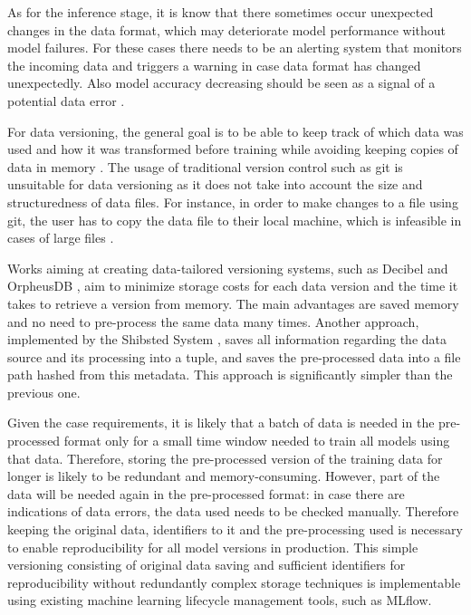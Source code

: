 As for the inference stage, it is know that there sometimes occur unexpected changes in the data format, which may deteriorate model performance without model failures. For these cases there needs to be an alerting system that monitors the incoming data and triggers a warning in case data format has changed unexpectedly. Also model accuracy decreasing should be seen as a signal of a potential data error \cite{polyzotis_data_2018}.

For data versioning, the general goal is to be able to keep track of which data was used and how it was transformed before training while avoiding keeping copies of data in memory \cite{maddox_decibel_2016}. The usage of traditional version control such as git is unsuitable for data versioning as it does not take into account the size and structuredness of data files. For instance, in order to make changes to a file using git, the user has to copy the data file to their local machine, which is infeasible in cases of large files \cite{maddox_decibel_2016}.

Works aiming at creating data-tailored versioning systems, such as Decibel \cite{maddox_decibel_2016} and OrpheusDB \cite{huang_effective_2019}, aim to minimize storage costs for each data version and the time it takes to retrieve a version from memory. The main advantages are saved memory and no need to pre-process the same data many times. Another approach, implemented by the Shibsted System \cite{van_der_weide_versioning_2017}, saves all information regarding the data source and its processing into a tuple, and saves the pre-processed data into a file path hashed from this metadata. This approach is significantly simpler than the previous one.

Given the case requirements, it is likely that a batch of data is needed in the pre-processed format only for a small time window needed to train all models using that data. Therefore, storing the pre-processed version of the training data for longer is likely to be redundant and memory-consuming. However, part of the data will be needed again in the pre-processed format: in case there are indications of data errors, the data used needs to be checked manually. Therefore keeping the original data, identifiers to it and the pre-processing used is necessary to enable reproducibility for all model versions in production. This simple versioning consisting of original data saving and sufficient identifiers for reproducibility without redundantly complex storage techniques is implementable using existing machine learning lifecycle management tools, such as MLflow.

